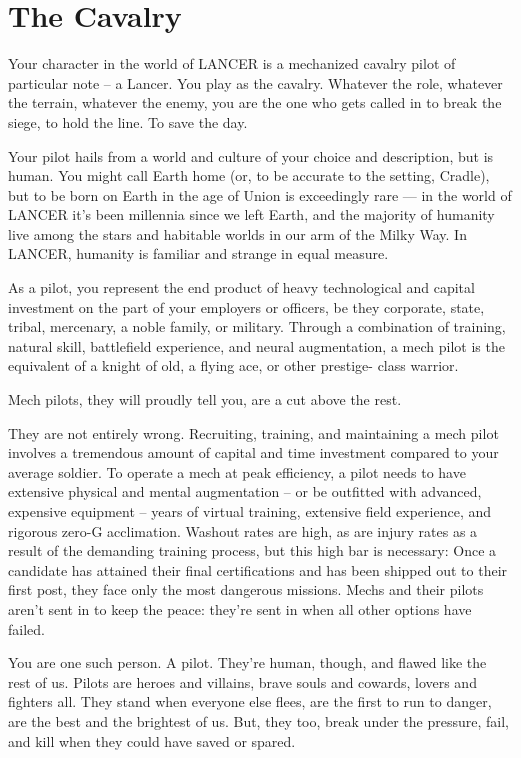 \section{The Cavalry}

Your character in the world of LANCER is a mechanized cavalry pilot of particular note -- a
Lancer. You play as the cavalry. Whatever the role, whatever the terrain, whatever the enemy,
you are the one who gets called in to break the siege, to hold the line. To save the day.

Your pilot hails from a world and culture of your choice and description, but is human. You might
call Earth home (or, to be accurate to the setting, Cradle), but to be born on Earth in the age of
Union is exceedingly rare — in the world of LANCER it’s been millennia since we left Earth, and
the majority of humanity live among the stars and habitable worlds in our arm of the Milky Way.
In LANCER, humanity is familiar and strange in equal measure.

As a pilot, you represent the end product of heavy technological and capital investment on the
part of your employers or officers, be they corporate, state, tribal, mercenary, a noble family, or
military. Through a combination of training, natural skill, battlefield experience, and neural
augmentation, a mech pilot is the equivalent of a knight of old, a flying ace, or other prestige-
class warrior.

Mech pilots, they will proudly tell you, are a cut above the rest.

They are not entirely wrong. Recruiting, training, and maintaining a mech pilot involves a
tremendous amount of capital and time investment compared to your average soldier. To operate
a mech at peak efficiency, a pilot needs to have extensive physical and mental augmentation --
or be outfitted with advanced, expensive equipment -- years of virtual training, extensive field
experience, and rigorous zero-G acclimation. Washout rates are high, as are injury rates as a
result of the demanding training process, but this high bar is necessary: Once a candidate has
attained their final certifications and has been shipped out to their first post, they face only the
most dangerous missions. Mechs and their pilots aren’t sent in to keep the peace: they’re sent in
when all other options have failed.

You are one such person. A pilot. They’re human, though, and flawed like the rest of us. Pilots
are heroes and villains, brave souls and cowards, lovers and fighters all. They stand when
everyone else flees, are the first to run to danger, are the best and the brightest of us. But, they
too, break under the pressure, fail, and kill when they could have saved or spared.

